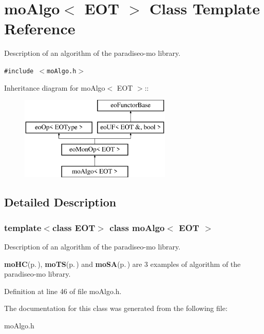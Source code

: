 \section{mo\-Algo$<$ EOT $>$ Class Template Reference}
\label{classmo_algo}
Description of an algorithm of the paradiseo-mo library.  


{\tt \#include $<$mo\-Algo.h$>$}

Inheritance diagram for mo\-Algo$<$ EOT $>$::\begin{figure}[H]
\begin{center}
\leavevmode
\includegraphics[height=4cm]{classmo_algo}
\end{center}
\end{figure}


\subsection{Detailed Description}
\subsubsection*{template$<$class EOT$>$ class mo\-Algo$<$ EOT $>$}

Description of an algorithm of the paradiseo-mo library. 

{\bf mo\-HC}{\rm (p.\,\pageref{classmo_h_c})}, {\bf mo\-TS}{\rm (p.\,\pageref{classmo_t_s})} and {\bf mo\-SA}{\rm (p.\,\pageref{classmo_s_a})} are 3 examples of algorithm of the paradiseo-mo library. 



Definition at line 46 of file mo\-Algo.h.

The documentation for this class was generated from the following file:\begin{CompactItemize}
\item 
mo\-Algo.h\end{CompactItemize}

